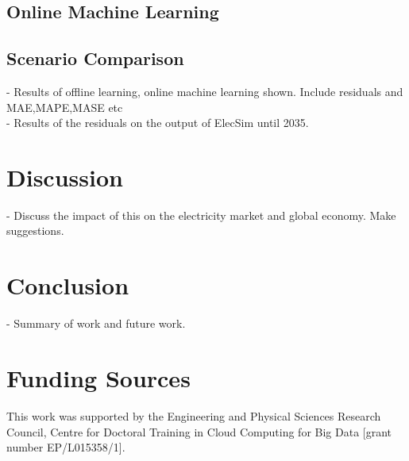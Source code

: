 \documentclass[final,3p,times,twocolumn,numbers]{elsarticle}
\begin{document}




\subsection{Online Machine Learning}


\subsection{Scenario Comparison}




- Results of offline learning, online machine learning shown. Include residuals and MAE,MAPE,MASE etc\\

- Results of the residuals on the output of ElecSim until 2035.\\

\section{Discussion}
\label{sec:discussion}

- Discuss the impact of this on the electricity market and global economy. Make suggestions.

\section{Conclusion}
\label{sec:conclusion}

- Summary of work and future work.

\section{Funding Sources}

This work was supported by the Engineering and Physical Sciences Research Council, Centre for Doctoral Training in Cloud Computing for Big Data [grant number EP/L015358/1].






\end{document}
